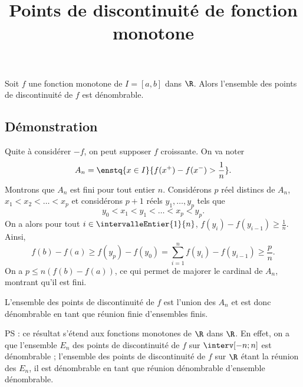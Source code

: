 \documentclass[fontsize=12pt,twoside=false,parskip=half, french]{scrartcl}
\title{Points de discontinuité de fonction monotone}
\date{}
\author{}
\begin{document}
\maketitle
   \begin{Theoreme}
      Soit $f$ une fonction monotone de $I = [a, b]$ dans $\R$. Alors l’ensemble des points de discontinuité de $f$ est 
      dénombrable.
   \end{Theoreme}
   \subsection{Démonstration}
      Quite à considérer $-f$, on peut supposer $f$ croissante.
      On va noter
      \[
         A_n = \enstq{x \in I}{f(x^+) - f(x^-) > \frac{1}{n}}.
      \]
      Montrons que $A_n$ est fini pour tout entier $n$. Considérons $p$ réel distincs de $A_n$, $x_1 < x_2 < \ldots < x_p$ 
      et considérons $p + 1$ réels $y_1, \ldots, y_p$ tels que
      \[
         y_0 < x_1 < y_1 < \ldots < x_p < y_p.
      \]
      On a alors pour tout $i \in \intervalleEntier{1}{n}$, $f(y_i) - f(y_{i- 1}) \geq \frac{1}{n}$. Ainsi,
      \[
         f(b) - f(a) \geq f(y_p) - f(y_0) = \sum_{i = 1}^n f(y_i) - f(y_{i - 1}) \geq \frac{p}{n}.
      \]
      On a $p \leq n(f(b) - f(a))$, ce qui permet de majorer le cardinal de $A_n$, montrant qu’il est fini.
      
      L’ensemble des points de discontinuité de $f$ est l’union des $A_n$ et est donc dénombrable en tant que réunion
      finie d’ensembles finis.
      
      PS : ce résultat s’étend aux fonctions monotones de $\R$ dans $\R$. En effet, on a que l’ensemble $E_n$
           des points de discontinuité de $f$ sur $\interv[-n; n]$ est dénombrable ; l’ensemble des points de discontinuité
           de $f$ sur $\R$ étant la réunion des $E_n$, il est dénombrable en tant que réunion dénombrable d’ensemble dénombrable.
\end{document}
